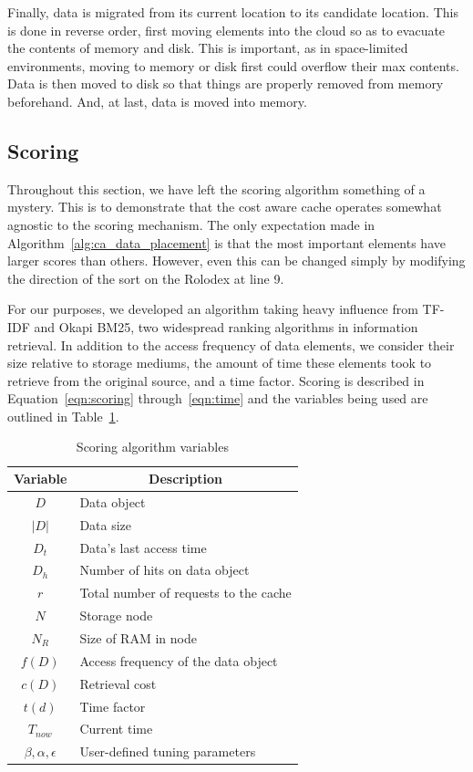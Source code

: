 Finally, data is migrated from its current location to its candidate location.
This is done in reverse order, first moving elements into the cloud so as to
evacuate the contents of memory and disk. This is important, as in
space-limited environments, moving to memory or disk first could overflow their
max contents. Data is then moved to disk so that things are properly removed
from memory beforehand. And, at last, data is moved into memory.

\subsection{Scoring} %
\label{sub:ca_scoring}
Throughout this section, we have left the scoring algorithm something of a
mystery. This is to demonstrate that the cost aware cache operates somewhat
agnostic to the scoring mechanism. The only expectation made in
Algorithm~\ref{alg:ca_data_placement} is that the most important elements have
larger scores than others. However, even this can be changed simply by
modifying the direction of the sort on the Rolodex at line 9.

For our purposes, we developed an algorithm taking heavy influence from TF-IDF
and Okapi BM25\cite{tfidf,bm25}, two widespread ranking algorithms in
information retrieval. In addition to the access frequency of data elements, we
consider their size relative to storage mediums, the amount of time these
elements took to retrieve from the original source, and a time factor. Scoring
is described in Equation~\ref{eqn:scoring} through~\ref{eqn:time} and the
variables being used are outlined in Table~\ref{tab:scoring_variables}.

\begin{table}[htp]
  \begin{center}
    \begin{tabular}{|c|l|}
      \hline
      \multicolumn{1}{|c}{\textbf{Variable}} &
      \multicolumn{1}{|c|}{\textbf{Description}}\\
      \hline
				$D$ & Data object\\
				$|D|$ & Data size\\
				$D_t$ & Data's last access time\\
				$D_h$ & Number of hits on data object\\
				$r$ & Total number of requests to the cache\\
				$N$ & Storage node\\
				$N_R$ & Size of RAM in node\\
				$f(D)$ & Access frequency of the data object\\
				$c(D)$ & Retrieval cost\\
				$t(d)$ & Time factor\\
				$T_{now}$ & Current time\\
				$\beta,\alpha,\epsilon$ & User-defined tuning parameters\\
      \hline
    \end{tabular}
    \caption{Scoring algorithm variables}
    \label{tab:scoring_variables}
  \end{center}
\end{table}


